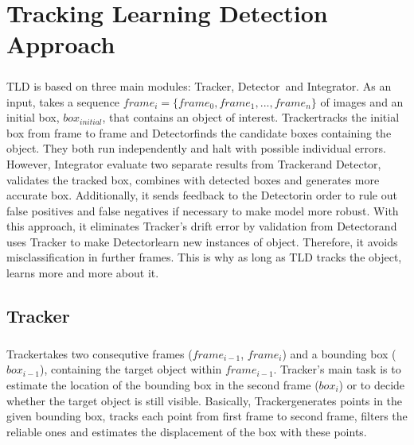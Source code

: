 \documentclass{report}
\newcommand{\Tracker}{Tracker}
\newcommand{\Detector}{Detector}
\newcommand{\Integrator}{Integrator}
\newcommand{\initialbox}{$ box_{initial} $}
\begin{document}

    \chapter{Tracking Learning Detection Approach}
    \paragraph{}
        TLD is based on three main modules: \Tracker, \Detector\ and \Integrator.
        As an input, takes a sequence $ frame_{i} = \{ frame_{0}, frame_{1}, ..., frame_{n} \}$ of images
        and an initial box, \initialbox, that contains an object of interest.
        \Tracker tracks the initial box from frame to frame and \Detector finds the candidate boxes containing the object.
        They both run independently and halt with possible individual errors. However, Integrator
        evaluate two separate results from \Tracker and \Detector, validates the tracked box, combines with detected boxes
        and generates more accurate box.
        Additionally, it sends feedback to the \Detector in order to rule out false positives and false negatives
        if necessary to make model more robust.
        With this approach, it eliminates \Tracker's drift error by validation from \Detector and uses \Tracker
        to make \Detector learn new instances of object. Therefore, it avoids misclassification in further frames.
        This is why as long as TLD tracks the object, learns more and more about it.
    \section{Tracker}
        \paragraph{}
            \Tracker takes two consequtive frames ($frame_{i-1}$, $frame_{i}$)
            and a bounding box ($box_{i-1}$), containing the target object within $frame_{i-1}$.
            \Tracker's main task is to estimate the location of the bounding box in the second frame ($box_{i}$)
            or to decide whether the target object is still visible. Basically, \Tracker generates points in the given
            bounding box, tracks each point from first frame to second frame, filters the reliable ones and estimates
            the displacement of the box with these points.
\end{document}

